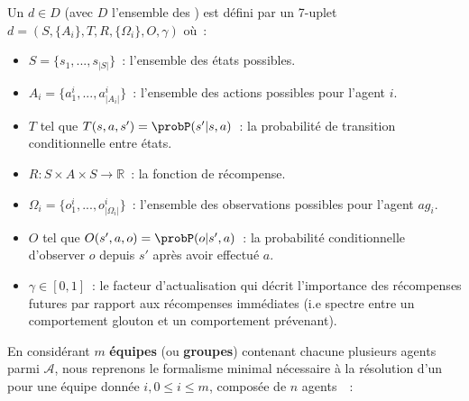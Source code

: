 Un  $d \in D$ (avec $D$ l'ensemble des ) est défini par un 7-uplet $d = (S,\{A_i\},T,R,\{\Omega_i\},O,\gamma)$ où~:
\begin{itemize}
    \item $S = \{s_1, ..., s_{|S|}\}$~: l'ensemble des états possibles.
    \item $A_i = \{a_1^i, ..., a_{|A_i|}^i\}$~: l'ensemble des actions possibles pour l'agent $i$.
    \item $T$ tel que $T(s,a,s') = \probP(s'|s,a)$~: la probabilité de transition conditionnelle entre états.
    \item $R: S \times A \times S \rightarrow \mathbb{R}$~: la fonction de récompense.
    \item $\Omega_i = \{o_1^i, ..., o_{|\Omega_i|}^i\}$~: l'ensemble des observations possibles pour l'agent $ag_i$.
    \item $O$ tel que $O(s',a,o) = \probP(o|s',a)$~: la probabilité conditionnelle d'observer $o$ depuis $s'$ après avoir effectué $a$.
    \item $\gamma \in [0,1]$~: le facteur d'actualisation qui décrit l'importance des récompenses futures par rapport aux récompenses immédiates (i.e spectre entre un comportement glouton et un comportement prévenant).
\end{itemize}

En considérant $m$ \textbf{équipes} (ou \textbf{groupes}) contenant chacune plusieurs agents parmi $\mathcal{A}$, nous reprenons le formalisme minimal nécessaire à la résolution d'un  pour une équipe donnée $i, 0 \leq i \leq m$, composée de $n$ agents~\cite{Beynier2013,Albrecht2024}~:

